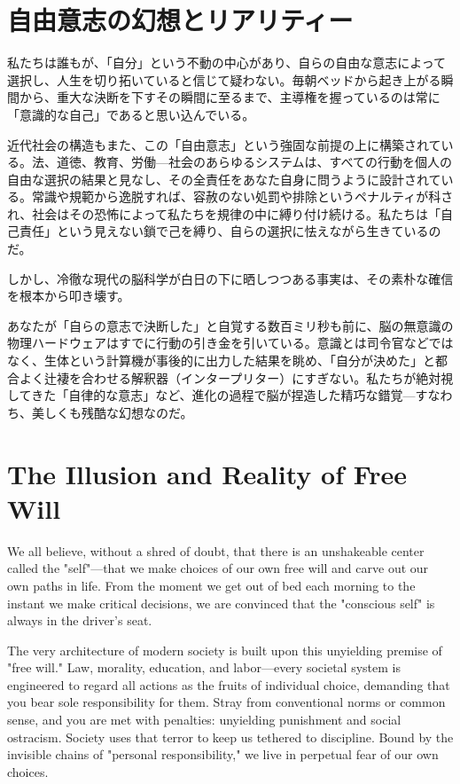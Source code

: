\ifja
    \chapter{自由意志の幻想とリアリティー}
    私たちは誰もが、「自分」という不動の中心があり、自らの自由な意志によって選択し、人生を切り拓いていると信じて疑わない。毎朝ベッドから起き上がる瞬間から、重大な決断を下すその瞬間に至るまで、主導権を握っているのは常に「意識的な自己」であると思い込んでいる。

    近代社会の構造もまた、この「自由意志」という強固な前提の上に構築されている。法、道徳、教育、労働—社会のあらゆるシステムは、すべての行動を個人の自由な選択の結果と見なし、その全責任をあなた自身に問うように設計されている。常識や規範から逸脱すれば、容赦のない処罰や排除というペナルティが科され、社会はその恐怖によって私たちを規律の中に縛り付け続ける。私たちは「自己責任」という見えない鎖で己を縛り、自らの選択に怯えながら生きているのだ。

    しかし、冷徹な現代の脳科学が白日の下に晒しつつある事実は、その素朴な確信を根本から叩き壊す。

    あなたが「自らの意志で決断した」と自覚する数百ミリ秒も前に、脳の無意識の物理ハードウェアはすでに行動の引き金を引いている。意識とは司令官などではなく、生体という計算機が事後的に出力した結果を眺め、「自分が決めた」と都合よく辻褄を合わせる解釈器（インタープリター）にすぎない。私たちが絶対視してきた「自律的な意志」など、進化の過程で脳が捏造した精巧な錯覚—すなわち、美しくも残酷な幻想なのだ。
\else
    \chapter{The Illusion and Reality of Free Will}
    We all believe, without a shred of doubt, that there is an unshakeable center called the "self"—that we make choices of our own free will and carve out our own paths in life. From the moment we get out of bed each morning to the instant we make critical decisions, we are convinced that the "conscious self" is always in the driver's seat.

    The very architecture of modern society is built upon this unyielding premise of "free will." Law, morality, education, and labor—every societal system is engineered to regard all actions as the fruits of individual choice, demanding that you bear sole responsibility for them. Stray from conventional norms or common sense, and you are met with penalties: unyielding punishment and social ostracism. Society uses that terror to keep us tethered to discipline. Bound by the invisible chains of "personal responsibility," we live in perpetual fear of our own choices.

